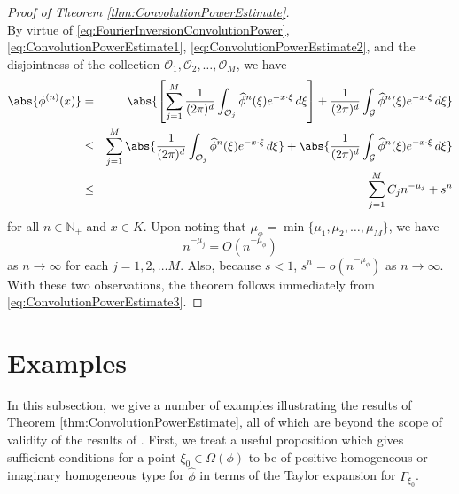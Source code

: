 \documentclass[11pt, letter]{book}
\newcommand{\lb}{\left[}
\newcommand{\rb}{\right]}
\begin{document}
\begin{proof}[Proof of Theorem \ref{thm:ConvolutionPowerEstimate}]
\begin{equation*}
\end{equation*}
By virtue of \eqref{eq:FourierInversionConvolutionPower}, \eqref{eq:ConvolutionPowerEstimate1}, \eqref{eq:ConvolutionPowerEstimate2}, and the disjointness of the collection $\mathcal{O}_1,\mathcal{O}_2,\dots,\mathcal{O}_M$, we have
\begin{eqnarray}\label{eq:ConvolutionPowerEstimate3}\nonumber
    \abs{\phi^{(n)}(x)}
    &=&\abs{\lb \sum_{j=1}^M\frac{1}{(2\pi)^d}\int_{\mathcal{O}_j}\widehat{\phi}^n(\xi)e^{-x\cdot\xi}\,d\xi \rb
    +\frac{1}{(2\pi)^d}\int_{\mathcal{G}}\widehat{\phi}^n(\xi)e^{-x\cdot\xi}\,d\xi}\\\nonumber
    &\leq&\sum_{j=1}^M\abs{\frac{1}{(2\pi)^d}\int_{\mathcal{O}_j}\widehat{\phi}^n(\xi)e^{-x\cdot\xi}\,d\xi}+\abs{\frac{1}{(2\pi)^d}\int_{\mathcal{G}}\widehat{\phi}^n(\xi)e^{-x\cdot\xi}\,d\xi}\\
    &\leq&\sum_{j=1}^M C_jn^{-\mu_j}+s^n
\end{eqnarray}
for all $n\in\mathbb{N}_+$ and $x\in K$. Upon noting that $\mu_\phi=\min\{\mu_1,\mu_2,\dots,\mu_M\}$, we have
\begin{equation*}
    n^{-\mu_j}=O(n^{-\mu_\phi})
\end{equation*}
as $n\to\infty$ for each $j=1,2,\dots M$. Also, because $s<1$, $s^n=o(n^{-\mu_\phi})$ as $n\to \infty$. With these two observations, the theorem follows immediately from \eqref{eq:ConvolutionPowerEstimate3}.
\end{proof}



\section{Examples}\label{sec:Examples}



In this subsection, we give a number of examples illustrating the results of Theorem \ref{thm:ConvolutionPowerEstimate}, all of which are beyond the scope of validity of the results of \cite{randles_convolution_2017}. First, we treat a useful proposition which gives sufficient conditions for a point $\xi_0\in\Omega(\phi)$ to be of positive homogeneous or imaginary homogeneous type for $\hat{\phi}$ in terms of the Taylor expansion for $\Gamma_{\xi_0}$.
\end{document}
